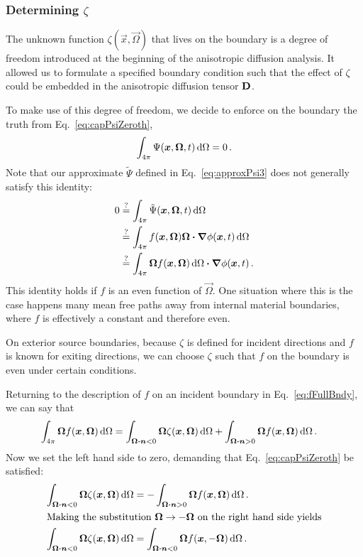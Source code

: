 \subsubsection{Determining $\zeta$}\label{sec:determiningZeta}
The unknown function $\zeta(\vec{x}, \vec{\Omega})$ that lives on the boundary
is a degree of freedom introduced at the beginning of the anisotropic
diffusion analysis. It allowed us to formulate a specified boundary condition
such that the effect of $\zeta$ could be embedded in the anisotropic diffusion
tensor $\mathbf{D}$.

To make use of this degree of freedom, we decide to enforce on the boundary the
truth from Eq.~\eqref{eq:capPsiZeroth},
\begin{equation*}
  \int_{4\pi} \Psi(\bm{x}, \bm{\Omega}, t) \mathop{}\!\mathrm{d}\Omega
  = 0 \,.
\end{equation*}
Note that our approximate $\tilde\Psi$ defined in Eq.~\eqref{eq:approxPsi3}
does not generally satisfy this identity:
\begin{align*}
  0
&\stackrel{\mathrm{?}}{=} \int_{4\pi} \tilde\Psi(\bm{x}, \bm{\Omega}, t) \mathop{}\!\mathrm{d}\Omega
\\
&\stackrel{\mathrm{?}}{=} \int_{4\pi} f(\bm{x}, \bm{\Omega}) \bm{\Omega}
\bm{\cdot} \bm{\nabla} \phi(\bm{x}, t)
\mathop{}\!\mathrm{d}\Omega
\\
&\stackrel{\mathrm{?}}{=} \int_{4\pi} \bm{\Omega} f(\bm{x}, \bm{\Omega})\mathop{}\!\mathrm{d}\Omega
\bm{\cdot} \bm{\nabla} \phi(\bm{x}, t) \,.
\end{align*}
This identity holds if $f$ is an even function of $\vec{\Omega}$.
One situation where this is the case happens many mean free paths away from
internal material boundaries, where $f$ is effectively a constant and therefore
even.

On exterior source boundaries, because $\zeta$ is defined for incident
directions and $f$ is known for exiting directions, we can choose $\zeta$ such
that $f$ on the boundary is even under certain conditions.

Returning to the description of $f$ on an incident boundary in
Eq.~\eqref{eq:fFullBndy}, we can say that
\begin{align*}
  \int_{4\pi} \bm{\Omega} f(\bm{x}, \bm{\Omega})\mathop{}\!\mathrm{d}\Omega
  &= \int_{\bm{\Omega} \bm{\cdot} \bm{n} < 0}
  \bm{\Omega} \zeta(\bm{x}, \bm{\Omega})\mathop{}\!\mathrm{d}\Omega
  + \int_{\bm{\Omega} \bm{\cdot} \bm{n} > 0}
  \bm{\Omega} f(\bm{x}, \bm{\Omega})\mathop{}\!\mathrm{d}\Omega\,.
\end{align*}
Now we set the left hand side to zero, demanding that
Eq.~\eqref{eq:capPsiZeroth} be satisfied:
\begin{align} \nonumber
  \int_{\bm{\Omega} \bm{\cdot} \bm{n} < 0}
  \bm{\Omega} \zeta(\bm{x}, \bm{\Omega})\mathop{}\!\mathrm{d}\Omega
  &= -\int_{\bm{\Omega} \bm{\cdot} \bm{n} > 0}
  \bm{\Omega} f(\bm{x}, \bm{\Omega})\mathop{}\!\mathrm{d}\Omega \,.
  \\ 
  \intertext{Making the substitution $\bm{\Omega}\to -\bm{\Omega}$ on the
  right hand side yields}
  \label{eq:zetaCondition}
  \int_{\bm{\Omega} \bm{\cdot} \bm{n} < 0}
  \bm{\Omega} \zeta(\bm{x}, \bm{\Omega})\mathop{}\!\mathrm{d}\Omega
  &= \int_{\bm{\Omega} \bm{\cdot} \bm{n} < 0}
  \bm{\Omega} f(\bm{x}, -\bm{\Omega})\mathop{}\!\mathrm{d}\Omega \,.
\end{align}

